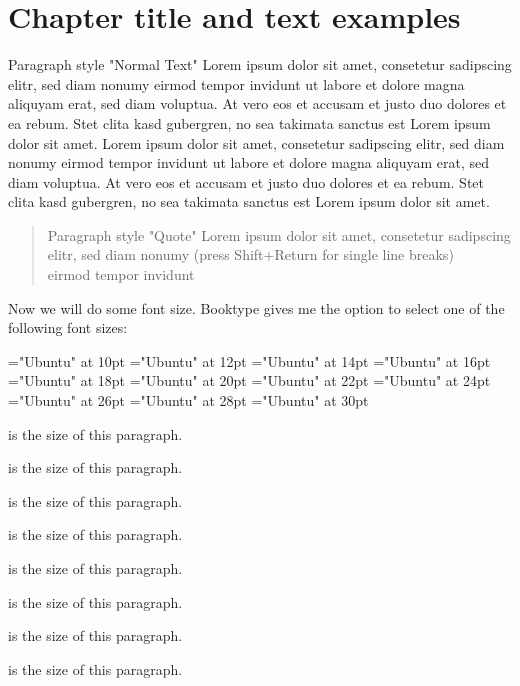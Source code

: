 \chapter{Chapter title and text examples}
Paragraph style "Normal Text" Lorem ipsum dolor sit amet,
consetetur sadipscing elitr, sed diam nonumy eirmod tempor invidunt
ut labore et dolore magna aliquyam erat, sed diam voluptua. At vero
eos et accusam et justo duo dolores et ea rebum. Stet clita kasd
gubergren, no sea takimata sanctus est Lorem ipsum dolor sit amet.
Lorem ipsum dolor sit amet, consetetur sadipscing elitr, sed diam
nonumy eirmod tempor invidunt ut labore et dolore magna aliquyam
erat, sed diam voluptua. At vero eos et accusam et justo duo
dolores et ea rebum. Stet clita kasd gubergren, no sea takimata
sanctus est Lorem ipsum dolor sit amet.

\begin{quote}
Paragraph style "Quote" Lorem ipsum dolor sit
amet, consetetur sadipscing elitr, sed diam nonumy (press
Shift+Return for single line breaks)\\
eirmod tempor invidunt
\end{quote}

Now we will do some font size. Booktype gives me the
option to select one of the following font sizes:

\font\FontSizeTenPT="Ubuntu" at 10pt
\font\FontSizeTwelvePT="Ubuntu" at 12pt
\font\FontSizeFourteenPT="Ubuntu" at 14pt
\font\FontSizeSixteenPT="Ubuntu" at 16pt
\font\FontSizeEighteenPT="Ubuntu" at 18pt
\font\FontSizeTwentyPT="Ubuntu" at 20pt
\font\FontSizeTwentytwoPT="Ubuntu" at 22pt
\font\FontSizeTwentyfourPT="Ubuntu" at 24pt
\font\FontSizeTwentysixPT="Ubuntu" at 26pt
\font\FontSizeTwentyeightPT="Ubuntu" at 28pt
\font\FontSizeThirtyPT="Ubuntu" at 30pt

{\FontSizeTenPT 10pt is the size of this paragraph.}

{\FontSizeTwelvePT 12pt is the size of this paragraph.}

{\FontSizeFourteenPT 14pt is the size of this paragraph.}

{\FontSizeSixteenPT 16pt is the size of this paragraph.}

{\FontSizeEighteenPT 18pt is the size of this paragraph.}

{\FontSizeTwentyPT 20pt is the size of this paragraph.}

{\FontSizeTwentytwoPT 22pt is the size of this paragraph.}

{\FontSizeTwentyfourPT 24pt is the size of this paragraph.}

